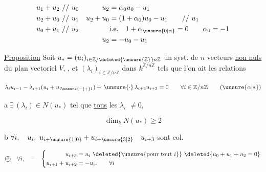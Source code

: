 
\begingroup
\makeatletter
\tagsleft@true
\makeatother

\[
\begin{aligned}
u_1+u_2&\ //\ u_0 &u_2&=\alpha_0u_0-u_1\\
u_2+u_0&\ //\ u_1 &u_2+u_0&=(1+\alpha_0)u_0-u_1\qquad //\ u_1\\
u_0+u_1&\ //\ u_2 &&\text{i.e.}\quad1+\alpha_{\unsure{0|\alpha}}=0\qquad\alpha_0=-1\\
&&u_2&=-u_0-u_1
\end{aligned}
\]

\uline{Proposition} Soit $u_*=(u_i)_{i\in\mathbb Z/\deleted{\unsure{\mathbb Z}}n\mathbb Z}$ un syst. de $n$ vecteurs  \uline{non nuls} du plan vectoriel $V$,  , et   $(\lambda_i)_{i\in\mathbb Z/n\mathbb Z}$ dans $k^{\mathbb Z/n\mathbb Z}$ tels que l'on  ait les relations

\[
\lambda_i u_{i-1}-\lambda_{i+1}(u_i+u_{i\unsure{-|+}1})+\,\unsure{\cdot}\,\lambda_{i+2}u_{i+2}=0
\qquad\forall i\in\mathbb Z/n\mathbb Z \tag*{($\unsure{\alpha|*}$)}
\]

  

 \textcircled{a}\quad $\exists\,(\lambda_i)\in N(u_*)$ tel que \uline{tous} les $\lambda_i$  $\ne0$,   


\[
\dim_k N(u_*)\geq2
\]

\textcircled{b}\quad $\forall i,\quad u_i,\ u_{i+\unsure{1|0}}+u_{i+\unsure{3|2}}\quad u_{i+3}$ sont col.

\[
\text{\textcircled{c}}\quad\forall i,\quad\text{--}\quad
\left\{\begin{aligned}
u_{i+3}&=u_i\ \deleted{\unsure{\text{pour tout }i}}\ \deleted{u_0+u_1+u_2=0}\\
u_{i+1}+u_{i+2}&=-u_i.\qquad \forall i
\end{aligned}\right.
\]

